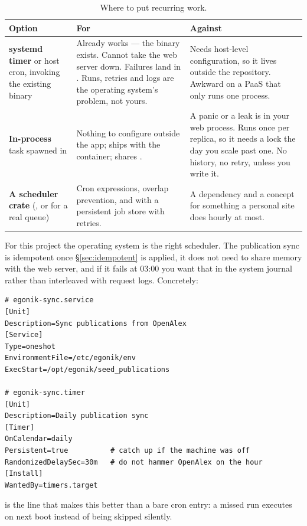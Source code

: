 \begin{table}[htbp]
\centering
\caption{Where to put recurring work.}
\label{tab:cron}
\small
\begin{tabular}{@{}L{0.20\textwidth}L{0.36\textwidth}L{0.36\textwidth}@{}}
\toprule
\textbf{Option} & \textbf{For} & \textbf{Against} \\
\midrule
\textbf{systemd timer} or host cron, invoking the existing binary &
Already works --- the binary exists. Cannot take the web server down. Failures land in
. Runs, retries and logs are the operating system's problem, not yours. &
Needs host-level configuration, so it lives outside the repository. Awkward on a PaaS that only runs
one process. \\
\textbf{In-process}  task spawned in  &
Nothing to configure outside the app; ships with the container; shares . &
A panic or a leak is in your web process. Runs once per replica, so it needs a lock the day you
scale past one. No history, no retry, unless you write it. \\
\textbf{A scheduler crate} (, or  for a real queue) &
Cron expressions, overlap prevention, and with  a persistent job store with retries. &
A dependency and a concept for something a personal site does hourly at most. \\
\bottomrule
\end{tabular}
\end{table}

\begin{pattern}
For this project the operating system is the right scheduler. The publication sync is idempotent
once \S\ref{sec:idempotent} is applied, it does not need to share memory with the web server, and if
it fails at 03:00 you want that in the system journal rather than interleaved with request logs.
Concretely:
\begin{lstlisting}[style=sh,caption={\file{/etc/systemd/system/egonik-sync.service} and \code{.timer}}]
# egonik-sync.service
[Unit]
Description=Sync publications from OpenAlex
[Service]
Type=oneshot
EnvironmentFile=/etc/egonik/env
ExecStart=/opt/egonik/seed_publications

# egonik-sync.timer
[Unit]
Description=Daily publication sync
[Timer]
OnCalendar=daily
Persistent=true          # catch up if the machine was off
RandomizedDelaySec=30m   # do not hammer OpenAlex on the hour
[Install]
WantedBy=timers.target
\end{lstlisting}
 is the line that makes this better than a bare cron entry: a missed run
executes on next boot instead of being skipped silently.
\end{pattern}

